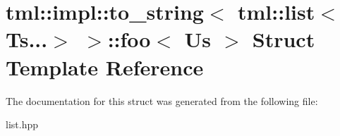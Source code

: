 \hypertarget{structtml_1_1impl_1_1to__string_3_01tml_1_1list_3_01Ts_8_8_8_4_01_4_1_1foo}{\section{tml\+:\+:impl\+:\+:to\+\_\+string$<$ tml\+:\+:list$<$ Ts...$>$ $>$\+:\+:foo$<$ Us $>$ Struct Template Reference}
\label{structtml_1_1impl_1_1to__string_3_01tml_1_1list_3_01Ts_8_8_8_4_01_4_1_1foo}
}


The documentation for this struct was generated from the following file\+:\begin{DoxyCompactItemize}
\item 
list.\+hpp\end{DoxyCompactItemize}
